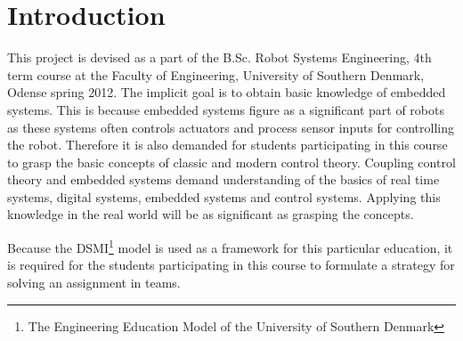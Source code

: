 \chapter{Introduction}\label{chap:intro}

This project is devised as a part of the B.Sc. Robot Systems Engineering, 4th term course at the Faculty of Engineering, University of Southern Denmark, Odense spring 2012. The implicit goal is to obtain basic knowledge of embedded systems. This is because embedded systems figure as a significant part of robots as these systems often controls actuators and process sensor inputs for controlling the robot. Therefore it is also demanded for students participating in this course to grasp the basic concepts of classic and modern control theory. Coupling control theory and embedded systems demand understanding of the basics of real time systems, digital systems, embedded systems and control systems. Applying this knowledge in the real world will be as significant as grasping the concepts.

Because the DSMI\footnote{The Engineering Education Model of the University of Southern Denmark} model is used as a framework for this particular education, it is required for the students participating in this course to formulate a strategy for solving an assignment in teams.

